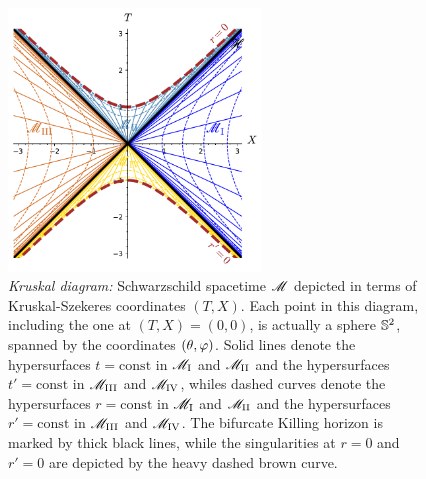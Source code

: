 \begin{figure}
\centerline{\includegraphics[width=0.6\textwidth]{max_kruskal_diag.pdf}}
\caption[]{\label{f:sch:kruskal_diag} \footnotesize
\emph{Kruskal diagram:}
Schwarzschild spacetime $\mathscr{M}$ depicted in terms of Kruskal-Szekeres coordinates $(T,X)$.
Each point in this diagram, including the one at $(T,X)=(0,0)$,
is actually a sphere $\mathbb{S}^2$, spanned by the
coordinates $(\theta,\varphi)$.
Solid lines denote the hypersurfaces $t=\mathrm{const}$ in $\mathscr{M}_{\rm I}$ and
$\mathscr{M}_{\rm II}$ and the  hypersurfaces $t'=\mathrm{const}$ in $\mathscr{M}_{\rm III}$ and
$\mathscr{M}_{\rm IV}$, whiles dashed curves
denote the hypersurfaces $r=\mathrm{const}$ in $\mathscr{M}_{\rm I}$ and
$\mathscr{M}_{\rm II}$ and the  hypersurfaces $r'=\mathrm{const}$ in $\mathscr{M}_{\rm III}$ and
$\mathscr{M}_{\rm IV}$.
The bifurcate Killing horizon is marked by thick black lines, while the
singularities at $r=0$ and $r'=0$ are depicted by the heavy dashed brown curve.}
\end{figure}

